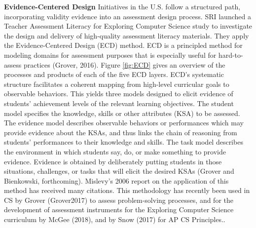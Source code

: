 

%



\textbf{Evidence-Centered Design}\newline
Initiatives in the U.S. follow a structured path, incorporating validity evidence into an assessment design process. SRI launched a Teacher Assessment Literacy for Exploring Computer Science study to investigate the design and delivery of high-quality assessment literacy materials. They apply the Evidence-Centered Design (ECD) method. ECD is a principled method for modeling domains for assessment purposes that is especially useful for hard-to-assess practices (Grover, 2016). Figure \ref{fig:ECD} gives an overview of the processes and products of each of the five ECD layers. ECD's systematic structure facilitates a coherent mapping from high-level curricular goals to observable behaviors. This yields three models designed to elicit evidence of students' achievement levels of the relevant learning objectives. The student model specifies the knowledge, skills or other attributes (KSA) to be assessed. The evidence model describes observable behaviors or performances which may provide evidence about the KSAs, and thus links the chain of reasoning from students’ performances to their knowledge and skills. The task model describes the environment in which students say, do, or make something to provide evidence. Evidence is obtained by deliberately putting students in those situations, challenges, or tasks that will elicit the desired KSAs (Grover and Bienkowski, forthcoming). Mislevy's 2006 report on the application of this method has received many citations. This methodology has recently been used in CS by Grover (Grover2017) to assess problem-solving processes, and for the development of assessment instruments for the Exploring Computer Science curriculum by McGee (2018), and by Snow (2017) for AP CS Principles..






